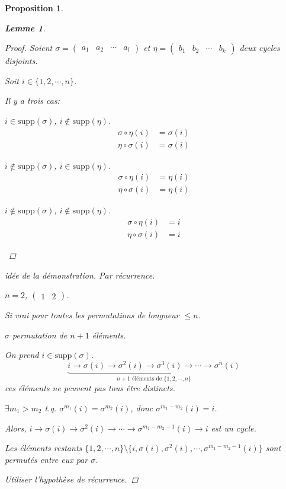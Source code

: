 \documentclass{report}
\newcommand*{\lte}{\leqslant}
\newtheorem*{lem}{Lemme}
\newtheorem*{prop}{Proposition}
\theoremstyle{definition}
\theoremstyle{remark}
\newenvironment*{subsubproof}[1][D\'emonstration]
{
\begin{proof}[#1]
}
{
	\renewcommand{\qedsymbol}{$\#$}
\end{proof}
\renewcommand{\qedsymbol}{$\blacksquare$}
}
\begin{document}
\begin{prop}
\begin{lem}
\begin{proof}
				Soient $\sigma=\begin{pmatrix}
					a_1&a_2&\dotsb&a_l
				\end{pmatrix}$ et $\eta=\begin{pmatrix}
				b_1&b_2&\dotsb&b_k
				\end{pmatrix}$ deux cycles disjoints.

				Soit $i \in \{1,2,\dotsb,n\}$.

				Il y a trois cas:
				\begin{nlist}
					\item $i \in \mathrm{supp}(\sigma)$, $i \notin \mathrm{supp}(\eta)$.
					\begin{align*}
						\sigma \circ \eta(i)&= \sigma(i)\\
						\eta \circ \sigma(i)&= \sigma(i)
					\end{align*}
					\item $i \notin \mathrm{supp}(\sigma)$, $i \in \mathrm{supp}(\eta)$.
					\begin{align*}
						\sigma \circ \eta(i)&= \eta(i)\\
						\eta \circ \sigma(i)&= \eta(i)
					\end{align*}
					\item $i \notin \mathrm{supp}(\sigma)$, $i \notin \mathrm{supp}(\eta)$.
					\begin{align*}
						\sigma \circ \eta(i)&= i\\
						\eta \circ \sigma(i)&=i
					\end{align*}
				\end{nlist}
			\end{proof}
		\end{lem}
		\begin{subsubproof}[id\'ee de la d\'emonstration]
			Par r\'ecurrence.

			$n=2$, $\begin{pmatrix}
				1&2
			\end{pmatrix}$.

			Si vrai pour toutes les permutations de longueur $\lte n$.

			$\sigma$ permutation de $n+1$ \'el\'ements.

			On prend $i \in \mathrm{supp}(\sigma)$.
			\[
			\underbrace{i \to \sigma(i) \to \sigma^2(i) \to \sigma^3(i) \to \dotsb \to \sigma^n(i)}_{n+1\text{ \'el\'ements de }\{1,2,\dotsb,n\}}
			\]
			ces \'el\'ements ne peuvent pas tous \^etre distincts.

			$\exists m_1>m_2$ t.q. $\sigma^{m_1}(i) = \sigma^{m_2}(i)$, donc $\sigma^{m_1-m_2}(i) = i$.

			Alors, $i \to \sigma(i) \to \sigma^2(i) \to \dotsb \to \sigma^{m_1-m_2-1}(i) \to i$ est un cycle.

			Les \'el\'ements restants $\{1,2,\dotsb,n\} \setminus \{i, \sigma(i), \sigma^2(i), \dotsb, \sigma^{m_1-m_2-1}(i)\}$ sont permut\'es entre eux par $\sigma$.

			Utiliser l'hypoth\`ese de r\'ecurrence.
		\end{subsubproof}
	\end{prop}
\end{document}
